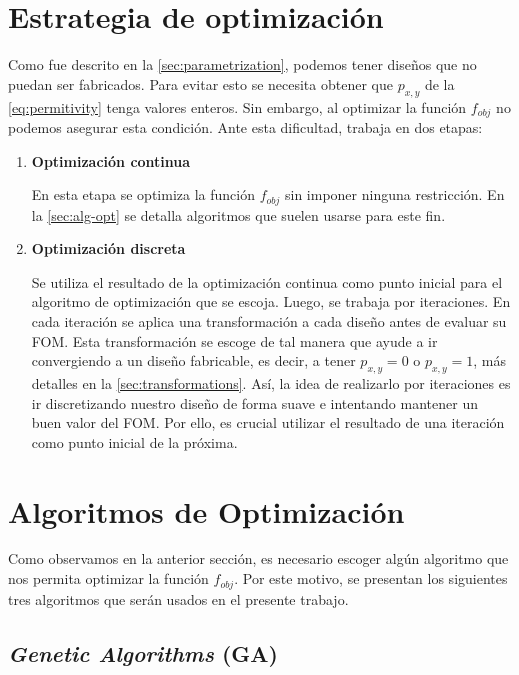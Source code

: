 \section{Estrategia de optimización}\label{sec:estrategia-optimizacion}

Como fue descrito en la \autoref{sec:parametrization}, podemos
tener diseños que no puedan ser fabricados.
Para evitar esto se necesita obtener que $p_{x, y}$ de la \autoref{eq:permitivity} tenga valores enteros.
Sin embargo, al optimizar la función $f_{obj}$ no podemos asegurar esta condición.
Ante esta dificultad, \cite{Su2020} trabaja en dos etapas:


\begin{enumerate}

\item{\textbf{Optimización continua}}

En esta etapa se optimiza la función $f_{obj}$ sin imponer ninguna restricción.
    En la \autoref{sec:alg-opt} se detalla algoritmos que suelen usarse para este fin.

\item{\textbf{Optimización discreta}}

Se utiliza el resultado de la optimización continua como punto inicial para el algoritmo de optimización que se escoja.
Luego, se trabaja por iteraciones.
En cada iteración se aplica una transformación a cada diseño antes de evaluar su FOM.
Esta transformación se escoge de tal manera que ayude a ir convergiendo a un diseño fabricable, es decir,
a tener $p_{x, y} = 0$ o $p_{x, y} = 1$, más detalles en la \autoref{sec:transformations}.
Así, la idea de realizarlo por iteraciones es ir discretizando nuestro diseño
de forma suave e intentando mantener un buen valor del FOM.
Por ello, es crucial utilizar el resultado de una iteración como punto inicial de la próxima.

\end{enumerate}

\section{Algoritmos de Optimización}\label{sec:alg-opt}

Como observamos en la anterior sección, es necesario escoger algún algoritmo
que nos permita optimizar la función $f_{obj}$. 
Por este motivo, se presentan los siguientes tres algoritmos que serán usados en el presente trabajo.

\subsection{\emph{Genetic Algorithms} (GA)}

